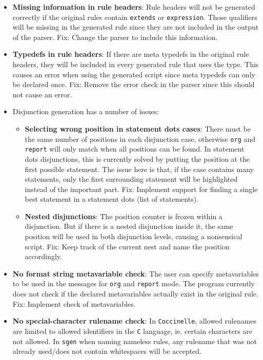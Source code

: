 \begin{itemize}
\item \textbf{Missing information in rule headers}: Rule headers will not be generated correctly if the original rules contain \texttt{extends} or \texttt{expression}. Those qualifiers will be missing in the generated rule since they are not included in the output of the parser.\newline
Fix: Change the parser to include this information.
\item \textbf{Typedefs in rule headers}: If there are meta typedefs in the original rule headers, they will be included in every generated rule that uses the type. This causes an error when using the generated script since meta typedefs can only be declared once.\newline
Fix: Remove the error check in the parser since this should not cause an error.
\item Disjunction generation has a number of issues:
\begin{itemize}
  \item \textbf{Selecting wrong position in statement dots cases}: There must be the same number of positions in each disjunction case, otherwise \texttt{org} and \texttt{report} will only match when all positions can be found. In statement dots disjunctions, this is currently solved by putting the position at the first possible statement. The issue here is that, if the case contains many statements, only the first surrounding statement will be highlighted instead of the important part.\newline
Fix: Implement support for finding a single best statement in a statement dots (list of statements).
  \item \textbf{Nested disjunctions}: The position counter is frozen within a disjunction. But if there is a nested disjunction inside it, the same position will be used in both disjunction levels, causing a nonsensical script.\newline
Fix: Keep track of the current nest and name the position accordingly.
\end{itemize}
\item \textbf{No format string metavariable check}: The user can specify metavariables to be used in the messages for \texttt{org} and \texttt{report} mode. The program currently does not check if the declared metavariables actually exist in the original rule.\newline
Fix: Implement check of metavariables.
\item \textbf{No special-character rulename check}: In \texttt{Coccinelle}, allowed rulenames are limited to allowed identifiers in the \texttt{C} language, ie. certain characters are not allowed. In \texttt{sgen} when naming nameless rules, any rulename that was not already used/does not contain whitespaces will be accepted.\newline

\end{itemize}
